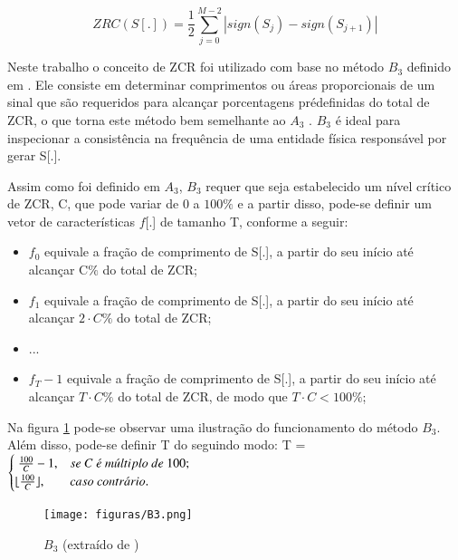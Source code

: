 \documentclass[a4paper,12pt,twoside,openright]{report}
\DeclarePairedDelimiter\floor{\lfloor}{\rfloor}
\begin{document}
\begin{equation}
ZRC(S[.]) = \frac{1}{2} \sum_{j=0}^{M-2}|sign(S_j)-sign(S_{j+1})|
\label{eqzrc}
\end{equation}

\par Neste trabalho o conceito de ZCR foi utilizado com base no m\'{e}todo $B_3$ definido em \cite{tut_zcr}. Ele consiste em determinar comprimentos ou \'{a}reas proporcionais de um sinal que s\~{a}o requeridos para alcan{\c c}ar porcentagens pr\'{e}definidas do total de ZCR, o que torna este m\'{e}todo bem semelhante ao $A_3$ \cite{tut_energia}. $B_3$ \'{e} ideal para inspecionar a consist\^{e}ncia na frequ\^{e}ncia de uma entidade f\'{i}sica respons\'{a}vel por gerar S[.].
\par Assim como foi definido em $A_3$, $B_3$ requer que seja estabelecido um n\'{i}vel cr\'{i}tico de ZCR, C, que pode variar de 0 a $100\%$ e a partir disso, pode-se definir um vetor de caracter\'{i}sticas $f$[.] de tamanho T, conforme a seguir:

\begin{itemize}
	\item {} $f_0$ equivale a fra{\c c}\~{a}o de comprimento de S[.], a partir do seu in\'{i}cio at\'{e} alcan{\c c}ar C$\%$ do total de ZCR;	
	\item {} $f_1$ equivale a fra{\c c}\~{a}o de comprimento de S[.], a partir do seu in\'{i}cio at\'{e} alcan{\c c}ar $2 \cdot C\%$ do total de ZCR;	
	\item {} ...	
	\item {} $f_T-1$ equivale a fra{\c c}\~{a}o de comprimento de S[.], a partir do seu in\'{i}cio at\'{e} alcan{\c c}ar $T \cdot C\%$ do total de ZCR, de modo que $T \cdot C  < 100 \%$;
\end{itemize}

\par Na figura \ref{figura:B3} pode-se observar uma ilustra{\c c}\~{a}o do funcionamento do m\'{e}todo $B_3$. Al\'{e}m disso, pode-se definir T do seguindo modo:
T =
$
\begin{cases}
\ \frac{100}{C} - 1, & se \ C \ \acute{e} \ m\acute{u}ltiplo \ de \ 100; \\
\floor{\frac{100}{C}}, & caso \ contr\acute{a}rio.
\end{cases}
$

\begin{figure}[H]
	\centering
	\texttt{[image: figuras/B3.png]}
	\caption{$B_3$ (extra\'{i}do de \cite{tut_zcr})}
	\label{figura:B3}
\end{figure}
\end{document}
